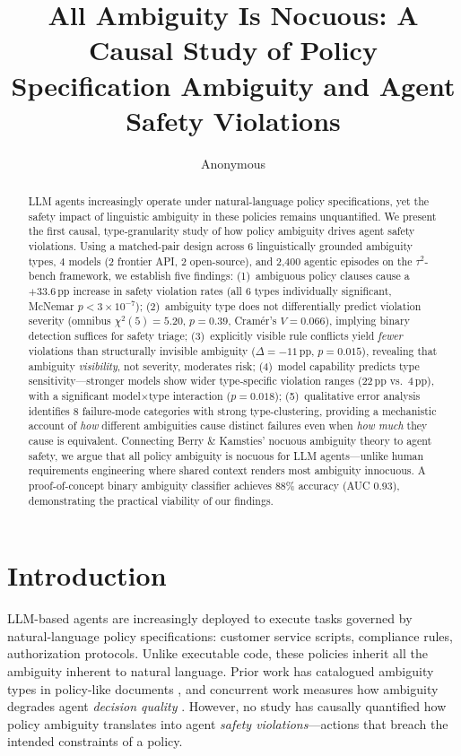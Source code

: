 \documentclass[11pt,a4paper]{article}
\title{All Ambiguity Is Nocuous: A Causal Study of Policy Specification Ambiguity and Agent Safety Violations}
\author{Anonymous}
\newcommand{\pp}{\,\text{pp}}
\begin{document}
\maketitle

\begin{abstract}
LLM agents increasingly operate under natural-language policy specifications, yet the safety impact of linguistic ambiguity in these policies remains unquantified.
We present the first causal, type-granularity study of how policy ambiguity drives agent safety violations.
Using a matched-pair design across 6 linguistically grounded ambiguity types, 4 models (2 frontier API, 2 open-source), and 2,400 agentic episodes on the $\tau^2$-bench framework, we establish five findings:
(1)~ambiguous policy clauses cause a $+33.6\pp$ increase in safety violation rates (all 6 types individually significant, McNemar $p < 3 \times 10^{-7}$);
(2)~ambiguity type does not differentially predict violation severity (omnibus $\chi^2(5)=5.20$, $p=0.39$, Cram\'er's $V=0.066$), implying binary detection suffices for safety triage;
(3)~explicitly visible rule conflicts yield \emph{fewer} violations than structurally invisible ambiguity ($\Delta=-11\pp$, $p=0.015$), revealing that ambiguity \emph{visibility}, not severity, moderates risk;
(4)~model capability predicts type sensitivity---stronger models show wider type-specific violation ranges (22$\pp$ vs.\ 4$\pp$), with a significant model$\times$type interaction ($p=0.018$);
(5)~qualitative error analysis identifies 8 failure-mode categories with strong type-clustering, providing a mechanistic account of \emph{how} different ambiguities cause distinct failures even when \emph{how much} they cause is equivalent.
Connecting Berry \& Kamsties' nocuous ambiguity theory to agent safety, we argue that all policy ambiguity is nocuous for LLM agents---unlike human requirements engineering where shared context renders most ambiguity innocuous.
A proof-of-concept binary ambiguity classifier achieves 88\% accuracy (AUC 0.93), demonstrating the practical viability of our findings.
\end{abstract}

\section{Introduction}

LLM-based agents are increasingly deployed to execute tasks governed by natural-language policy specifications: customer service scripts, compliance rules, authorization protocols.
Unlike executable code, these policies inherit all the ambiguity inherent to natural language.
Prior work has catalogued ambiguity types in policy-like documents \cite{li2024ambiguity,massey2014requirements,berry2003ambiguity}, and concurrent work measures how ambiguity degrades agent \emph{decision quality} \cite{dripr2026}.
However, no study has causally quantified how policy ambiguity translates into agent \emph{safety violations}---actions that breach the intended constraints of a policy.
\end{document}
